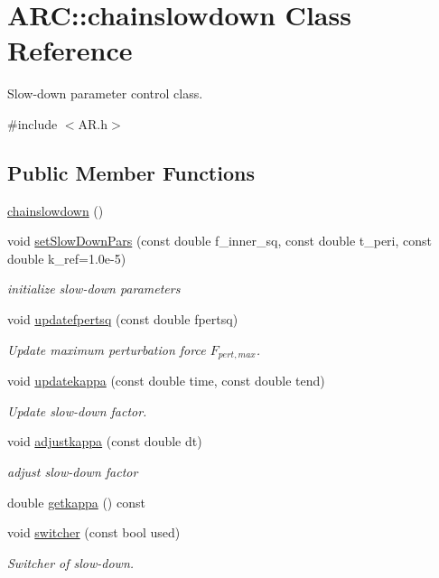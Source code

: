 \hypertarget{classARC_1_1chainslowdown}{}\section{A\+RC\+:\+:chainslowdown Class Reference}
\label{classARC_1_1chainslowdown}


Slow-\/down parameter control class.  




{\ttfamily \#include $<$A\+R.\+h$>$}

\subsection*{Public Member Functions}
\begin{DoxyCompactItemize}
\item 
\hyperlink{classARC_1_1chainslowdown_a3e91bbce388e9f0b01e2af5504dc694c}{chainslowdown} ()
\item 
void \hyperlink{classARC_1_1chainslowdown_ae60599148a33aa6b8f8a592015dcd5f7}{set\+Slow\+Down\+Pars} (const double f\+\_\+inner\+\_\+sq, const double t\+\_\+peri, const double k\+\_\+ref=1.\+0e-\/5)
\begin{DoxyCompactList}\small\item\em initialize slow-\/down parameters \end{DoxyCompactList}\item 
void \hyperlink{classARC_1_1chainslowdown_a3e4c09e74bbcae1620434f44bf447688}{updatefpertsq} (const double fpertsq)
\begin{DoxyCompactList}\small\item\em Update maximum perturbation force $ F_{pert,max}$. \end{DoxyCompactList}\item 
void \hyperlink{classARC_1_1chainslowdown_a934410c48096b12d93883967aae1883c}{updatekappa} (const double time, const double tend)
\begin{DoxyCompactList}\small\item\em Update slow-\/down factor. \end{DoxyCompactList}\item 
void \hyperlink{classARC_1_1chainslowdown_a5093b87af419b0a39dd73bfff7fd4915}{adjustkappa} (const double dt)
\begin{DoxyCompactList}\small\item\em adjust slow-\/down factor \end{DoxyCompactList}\item 
double \hyperlink{classARC_1_1chainslowdown_ac2504c790361770d774ad5db9afd9384}{getkappa} () const
\item 
void \hyperlink{classARC_1_1chainslowdown_ab6c31af1a15646feb388d486c8197c56}{switcher} (const bool used)
\begin{DoxyCompactList}\small\item\em Switcher of slow-\/down. \end{DoxyCompactList}\end{DoxyCompactItemize}
